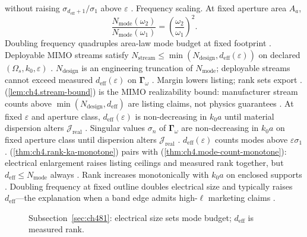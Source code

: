 without raising \(\sigma_{d_{\mathrm{eff}}+1}/\sigma_{1}\) above \(\varepsilon\) \cite{hansen1988}.
Frequency scaling. At fixed aperture area \(A_{a}\),
\begin{equation}
\label{eq:ch4.mode-freq-scaling}
\frac{N_{\mathrm{mode}}(\omega_{2})}{N_{\mathrm{mode}}(\omega_{1})}=\left(\frac{\omega_{2}}{\omega_{1}}\right)^{2}.
\end{equation}
Doubling frequency quadruples area-law mode budget at fixed footprint \cite{jackson1999}.
\label{lem:ch4.stream-bound}
Deployable MIMO streams satisfy \(N_{\mathrm{stream}}\le\min(N_{\mathrm{design}},d_{\mathrm{eff}}(\varepsilon))\) on declared \((\Omega_{s},k_{0},\varepsilon)\)
\cite{stratton1941}.
\(N_{\mathrm{design}}\) is an engineering truncation of \(N_{\mathrm{mode}}\); deployable streams cannot exceed measured \(d_{\mathrm{eff}}(\varepsilon)\)
on \(\boldsymbol{\Gamma}_\omega\) \cite{harrington2001}. Margin lowers listing; rank sets export \cite{stratton1941}.
(\ref{lem:ch4.stream-bound}) is the MIMO realizability bound: manufacturer stream counts above \(\min(N_{\mathrm{design}},d_{\mathrm{eff}})\) are
listing claims, not physics guarantees \cite{collin2001}.
\label{thm:ch4.rank-ka-monotone}
At fixed \(\varepsilon\) and aperture class, \(d_{\mathrm{eff}}(\varepsilon)\) is non-decreasing in \(k_{0}a\) until material dispersion alters
\(\mathcal{J}_{\mathrm{real}}\) \cite{stratton1941}.
Singular values \(\sigma_{n}\) of \(\boldsymbol{\Gamma}_\omega\) are non-decreasing in \(k_{0}a\) on fixed aperture class until dispersion alters
\(\mathcal{J}_{\mathrm{real}}\) \cite{hansen1988}. \(d_{\mathrm{eff}}(\varepsilon)\) counts modes above \(\varepsilon\sigma_{1}\)
\cite{stratton1941}.
(\ref{thm:ch4.rank-ka-monotone}) pairs with (\ref{thm:ch4.mode-count-monotone}): electrical enlargement raises listing ceilings and measured
rank together, but \(d_{\mathrm{eff}}\le N_{\mathrm{mode}}\) always \cite{collin2001}.
Rank increases monotonically with $k_0 a$ on enclosed supports \cite{jackson1999}. Doubling frequency at fixed outline doubles electrical size and typically raises $d_{\mathrm{eff}}$---the explanation when a band edge admits high-$\ell$ marketing claims \cite{stratton1941}.
\begin{figure}[t]
\centering
{}
\caption{Subsection~\ref{sec:ch481}: electrical size sets mode budget; \(d_{\mathrm{eff}}\) is measured rank.}
\label{fig:ch4.mode-count-bound}
\end{figure}
